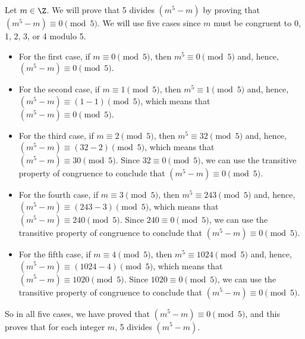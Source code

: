 \begin{enumerate}
\begin{enumerate}
\begin{myproof}
Let $m \in \Z$.  We will prove that 5 divides $\left(m^5 - m \right)$ by proving that 
$\left(m^5 - m \right) \equiv 0 \pmod 5$.  We will use five cases since $m$ must be congruent to 0, 1, 2, 3, or 4 modulo 5.

\begin{itemize}
\item For the first case, if $m \equiv 0 \pmod 5$, then $m^5 \equiv 0 \pmod 5$ and, hence, 
$\left(m^5 - m \right) \equiv 0 \pmod 5$.

\item For the second case, if $m \equiv 1 \pmod 5$, then $m^5 \equiv 1 \pmod 5$ and, hence, 
$\left(m^5 - m \right) \equiv (1 - 1) \pmod 5$, which means that 
$\left(m^5 - m \right) \equiv 0 \pmod 5$.

\item For the third case, if $m \equiv 2 \pmod 5$, then $m^5 \equiv 32 \pmod 5$ and, hence, 
$\left(m^5 - m \right) \equiv (32 - 2) \pmod 5$, which means that 
$\left(m^5 - m \right) \equiv 30 \pmod 5$.  Since $32 \equiv 0 \pmod 5$, we can use the transitive property of congruence to conclude that $\left(m^5 - m \right) \equiv 0 \pmod 5$.

\item For the fourth case, if $m \equiv 3 \pmod 5$, then $m^5 \equiv 243 \pmod 5$ and, hence, 
$\left(m^5 - m \right) \equiv (243 - 3) \pmod 5$, which means that 
$\left(m^5 - m \right) \equiv 240 \pmod 5$.  Since $240 \equiv 0 \pmod 5$, we can use the transitive property of congruence to conclude that $\left(m^5 - m \right) \equiv 0 \pmod 5$.

\item For the fifth case, if $m \equiv 4 \pmod 5$, then $m^5 \equiv 1024 \pmod 5$ and, hence, 
$\left(m^5 - m \right) \equiv (1024 - 4) \pmod 5$, which means that 
$\left(m^5 - m \right) \equiv 1020 \pmod 5$.  Since $1020 \equiv 0 \pmod 5$, we can use the transitive property of congruence to conclude that $\left(m^5 - m \right) \equiv 0 \pmod 5$.
\end{itemize}
So in all five cases, we have proved that $\left(m^5 - m \right) \equiv 0 \pmod 5$, and this proves that for each integer $m$, 5 divides $\left(m^5 - m \right)$.
\end{myproof}
\end{enumerate}
\end{enumerate}




